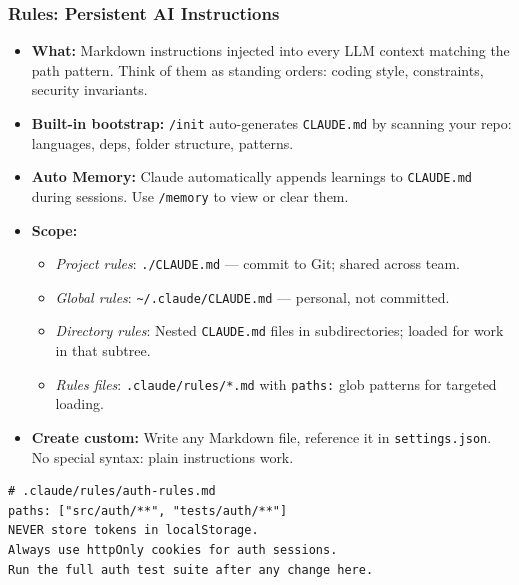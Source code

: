 \begin{frame}[fragile]\frametitle{Rules: Persistent AI Instructions}
  \begin{itemize}
    \item \textbf{What:} Markdown instructions injected into every LLM context matching the path pattern. Think of them as standing orders: coding style, constraints, security invariants.
    \item \textbf{Built-in bootstrap:} \texttt{/init} auto-generates \texttt{CLAUDE.md} by scanning your repo: languages, deps, folder structure, patterns.
    \item \textbf{Auto Memory:} Claude automatically appends learnings to \texttt{CLAUDE.md} during sessions. Use \texttt{/memory} to view or clear them.
    \item \textbf{Scope:}
      \begin{itemize}
        \item \textit{Project rules}: \texttt{./CLAUDE.md} --- commit to Git; shared across team.
        \item \textit{Global rules}: \texttt{\textasciitilde/.claude/CLAUDE.md} --- personal, not committed.
        \item \textit{Directory rules}: Nested \texttt{CLAUDE.md} files in subdirectories; loaded for work in that subtree.
        \item \textit{Rules files}: \texttt{.claude/rules/*.md} with \texttt{paths:} glob patterns for targeted loading.
      \end{itemize}
    \item \textbf{Create custom:} Write any Markdown file, reference it in \texttt{settings.json}. No special syntax: plain instructions work.
  \end{itemize}

\begin{lstlisting}
# .claude/rules/auth-rules.md
paths: ["src/auth/**", "tests/auth/**"]
NEVER store tokens in localStorage.
Always use httpOnly cookies for auth sessions.
Run the full auth test suite after any change here.
\end{lstlisting}
\end{frame}

